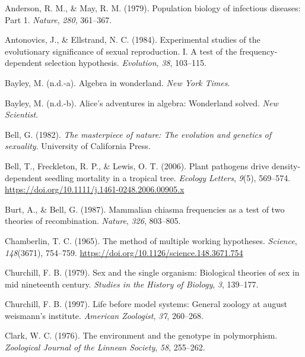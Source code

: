 \documentclass[
  letterpaper,
]{book}
\newlength{\cslhangindent}
\newlength{\cslentryspacingunit} %
\newenvironment{CSLReferences}[2] %
 {%
  \setlength{\parindent}{0pt}
  \ifodd #1
  \let\oldpar\par
  \def\par{\hangindent=\cslhangindent\oldpar}
  \fi
  \setlength{\parskip}{#2\cslentryspacingunit}
 }%
 {}
\begin{document}
\hypertarget{refs}{}
\begin{CSLReferences}{1}{0}
\leavevmode{}%
Anderson, R. M., \& May, R. M. (1979). Population biology of infectious
diseases: Part 1. \emph{Nature}, \emph{280}, 361--367.

\leavevmode{}%
Antonovics, J., \& Ellstrand, N. C. (1984). Experimental studies of the
evolutionary significance of sexual reproduction. I. A test of the
frequency-dependent selection hypothesis. \emph{Evolution}, \emph{38},
103--115.

\leavevmode{}%
Bayley, M. (n.d.-a). Algebra in wonderland. \emph{New York Times}.

\leavevmode{}%
Bayley, M. (n.d.-b). Alice's adventures in algebra: Wonderland solved.
\emph{New Scientist}.

\leavevmode{}%
Bell, G. (1982). \emph{The masterpiece of nature: The evolution and
genetics of sexuality}. University of California Press.

\leavevmode{}%
Bell, T., Freckleton, R. P., \& Lewis, O. T. (2006). Plant pathogens
drive density-dependent seedling mortality in a tropical tree.
\emph{Ecology Letters}, \emph{9}(5), 569--574.
\url{https://doi.org/10.1111/j.1461-0248.2006.00905.x}

\leavevmode{}%
Burt, A., \& Bell, G. (1987). Mammalian chiasma frequencies as a test of
two theories of recombination. \emph{Nature}, \emph{326}, 803--805.

\leavevmode{}%
Chamberlin, T. C. (1965). The method of multiple working hypotheses.
\emph{Science}, \emph{148}(3671), 754--759.
\url{https://doi.org/10.1126/science.148.3671.754}

\leavevmode{}%
Churchill, F. B. (1979). Sex and the single organism: Biological
theories of sex in mid nineteenth century. \emph{Studies in the History
of Biology}, \emph{3}, 139--177.

\leavevmode{}%
Churchill, F. B. (1997). Life before model systems: General zoology at
august weismann's institute. \emph{American Zoologist}, \emph{37},
260--268.

\leavevmode{}%
Clark, W. C. (1976). The environment and the genotype in polymorphism.
\emph{Zoological Journal of the Linnean Society}, \emph{58}, 255--262.


\end{CSLReferences}
\end{document}
